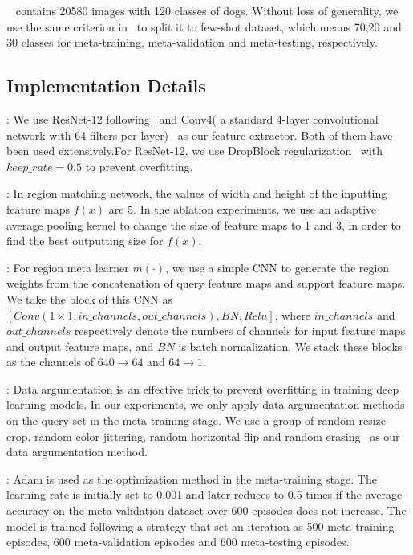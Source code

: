 \documentclass[letterpaper]{article}
\begin{document}
~\cite{stanforddogs} contains 20580 images with 120 classes of dogs. Without loss of generality, we use the same criterion in~\cite{li2019revisiting} to split it to few-shot dataset, which means 70,20 and 30 classes for meta-training, meta-validation and meta-testing, respectively.

\subsection{Implementation Details}
:
We use ResNet-12 following~\cite{lee2019meta,mishra2017simple} and Conv4( a standard 4-layer convolutional network with 64 filters per layer)~\cite{sung2018learning,li2019revisiting,VinyalsMatching} as our feature extractor. Both of them have been used extensively.For ResNet-12, we use DropBlock regularization~\cite{ghiasi2018dropblock} with $keep\_rate = 0.5$ to prevent overfitting. 


:
In region matching network, the values of width and height of the inputting feature maps $f(x)$ are 5. In the ablation experiments, we use an adaptive average pooling kernel to change the size of feature maps to 1 and 3, in order to find the best outputting size for $f(x)$. 

:
For region meta learner $m(\cdot)$, we use a simple CNN to generate the region weights from the concatenation of query feature maps and support feature maps. We take the block of this CNN as $[Conv(1\times1,in\_channels,out\_channels),BN,Relu]$, where $in\_channels$ and $out\_channels$ respectively denote the numbers of channels for input feature maps and output feature maps, and $BN$ is batch normalization. We stack these blocks as the channels of $640\to64$ and $64\to1$. 

:
Data argumentation is an effective trick to prevent overfitting in training deep learning models. In our experiments, we only apply data argumentation methods on the query set in the meta-training stage. We use a group of random resize crop, random color jittering, random horizontal flip and random erasing~\cite{zhong2020RandomE} as our data argumentation method.

: 
Adam is used as the optimization method in the meta-training stage. The learning rate is initially set to 0.001 and later reduces to 0.5 times if the average accuracy on the meta-validation dataset over 600 episodes does not increase. The model is trained following a strategy that set an iteration as 500 meta-training episodes, 600 meta-validation episodes and 600 meta-testing episodes. 
\end{document}
